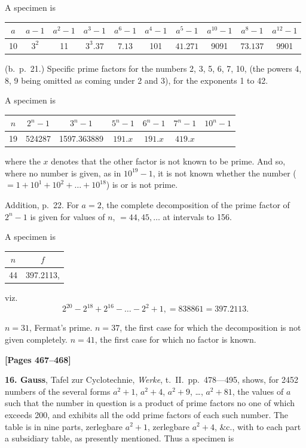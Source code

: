 \documentclass[11pt,a4paper]{book}
\begin{document}
A specimen is
\begin{center}
\begin{tabular}{c|c|c|c|c|c|c|c|c|c}
$a$ & $a-1$ & $a^{2}-1$ & $a^{3}-1$ & $a^{6}-1$ & $a^{4}-1$ & $a^{5}-1$ & $a^{10}-1$ & $a^{8}-1$ & $a^{12}-1$ \\
\hline
10 & $3^{2}$ & 11 & $3^{3}.37$ & $7.13$ & 101 & $41.271$ & 9091 & $73.137$ & 9901 \\
\end{tabular}
\end{center}

(b.\ p.\ 21.) Specific prime factors for the numbers 2, 3, 5, 6, 7, 10, (the powers 4, 8, 9 being omitted as coming under 2 and 3), for the exponents 1 to 42.

A specimen is
\begin{center}
\begin{tabular}{c|c|c|c|c|c|c}
$n$ & $2^{n}-1$ & $3^{n}-1$ & $5^{n}-1$ & $6^{n}-1$ & $7^{n}-1$ & $10^{n}-1$ \\
\hline
19 & 524287 & 1597.363889 & $191.x$ & $191.x$ & $419.x$ & \\
\end{tabular}
\end{center}
where the $x$ denotes that the other factor is not known to be prime. And so, where no number is given, as in $10^{19}-1$, it is not known whether the number ($=1+10^{1}+10^{2}+\ldots+10^{18}$) is or is not prime.

Addition, p.\ 22. For $a=2$, the complete decomposition of the prime factor of $2^{n}-1$ is given for values of $n$, $=44, 45, \ldots$ at intervals to 156.

A specimen is
\begin{center}
\begin{tabular}{c|c}
$n$ & $f$ \\
\hline
44 & 397.2113,
\end{tabular}
\end{center}
viz.
\[2^{20}-2^{18}+2^{16}-\ldots-2^{2}+1, = 838861 = 397.2113.\]

$n=31$, Fermat's prime. $n=37$, the first case for which the decomposition is not given completely. $n=41$, the first case for which no factor is known.

\newpage
\textbf{[Pages 467--468]}

\textbf{16. Gauss}, Tafel zur Cyclotechnie, \textit{Werke}, t.\ II.\ pp.\ 478---495, shows, for 2452 numbers of the several forms $a^{2}+1$, $a^{2}+4$, $a^{2}+9$, \ldots, $a^{2}+81$, the values of $a$ such that the number in question is a product of prime factors no one of which exceeds 200, and exhibits all the odd prime factors of each such number. The table is in nine parts, zerlegbare $a^{2}+1$, zerlegbare $a^{2}+4$, \&c., with to each part a subsidiary table, as presently mentioned. Thus a specimen is
\end{document}
